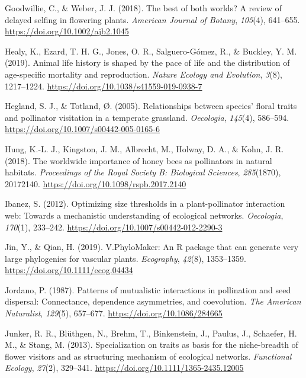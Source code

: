 \documentclass[
  12pt,
  a4paper,
]{article}
\newlength{\cslhangindent}
\newlength{\cslentryspacingunit} %
\newenvironment{CSLReferences}[2] %
 {%
  \setlength{\parindent}{0pt}
  \ifodd #1
  \let\oldpar\par
  \def\par{\hangindent=\cslhangindent\oldpar}
  \fi
  \setlength{\parskip}{#2\cslentryspacingunit}
 }%
 {}
\begin{document}
\begin{CSLReferences}{1}{0}
\leavevmode{}%
Goodwillie, C., \& Weber, J. J. (2018). The best of both worlds? A review of delayed selfing in flowering plants. \emph{American Journal of Botany}, \emph{105}(4), 641--655. \url{https://doi.org/10.1002/ajb2.1045}

\leavevmode{}%
Healy, K., Ezard, T. H. G., Jones, O. R., Salguero-Gómez, R., \& Buckley, Y. M. (2019). Animal life history is shaped by the pace of life and the distribution of age-specific mortality and reproduction. \emph{Nature Ecology and Evolution}, \emph{3}(8), 1217--1224. \url{https://doi.org/10.1038/s41559-019-0938-7}

\leavevmode{}%
Hegland, S. J., \& Totland, Ø. (2005). Relationships between species' floral traits and pollinator visitation in a temperate grassland. \emph{Oecologia}, \emph{145}(4), 586--594. \url{https://doi.org/10.1007/s00442-005-0165-6}

\leavevmode{}%
Hung, K.-L. J., Kingston, J. M., Albrecht, M., Holway, D. A., \& Kohn, J. R. (2018). The worldwide importance of honey bees as pollinators in natural habitats. \emph{Proceedings of the Royal Society B: Biological Sciences}, \emph{285}(1870), 20172140. \url{https://doi.org/10.1098/rspb.2017.2140}

\leavevmode{}%
Ibanez, S. (2012). Optimizing size thresholds in a plant-pollinator interaction web: Towards a mechanistic understanding of ecological networks. \emph{Oecologia}, \emph{170}(1), 233--242. \url{https://doi.org/10.1007/s00442-012-2290-3}

\leavevmode{}%
Jin, Y., \& Qian, H. (2019). V.{PhyloMaker}: An {R} package that can generate very large phylogenies for vascular plants. \emph{Ecography}, \emph{42}(8), 1353--1359. \url{https://doi.org/10.1111/ecog.04434}

\leavevmode{}%
Jordano, P. (1987). Patterns of mutualistic interactions in pollination and seed dispersal: Connectance, dependence asymmetries, and coevolution. \emph{The American Naturalist}, \emph{129}(5), 657--677. \url{https://doi.org/10.1086/284665}

\leavevmode{}%
Junker, R. R., Blüthgen, N., Brehm, T., Binkenstein, J., Paulus, J., Schaefer, H. M., \& Stang, M. (2013). Specialization on traits as basis for the niche-breadth of flower visitors and as structuring mechanism of ecological networks. \emph{Functional Ecology}, \emph{27}(2), 329--341. \url{https://doi.org/10.1111/1365-2435.12005}


\end{CSLReferences}
\end{document}
